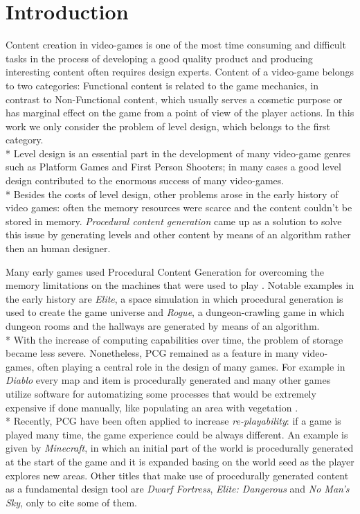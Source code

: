 \chapter{Introduction}

Content creation in video-games is one of the most time consuming and difficult tasks in the process of developing a good quality product and producing interesting content often requires design experts. Content of a video-game belongs to two categories: Functional content is related to the game mechanics, in contrast to Non-Functional content, which usually serves a cosmetic purpose or has marginal effect on the game from a point of view of the player actions. In this work we only consider the problem of level design, which belongs to the first category. \\*
Level design is an essential part in the development of many video-game genres such as Platform Games and First Person Shooters; in many cases a good level design contributed to the enormous success of many video-games. \\*
Besides the costs of level design, other problems arose in the early history of video games: often the memory resources were scarce and the content couldn't be stored in memory. \textit{Procedural content generation} came up as a solution to solve this issue by generating levels and other content by means of an algorithm rather then an human designer.

Many early games used Procedural Content Generation for overcoming the memory limitations on the machines that were used to play \cite{pcgbook}. Notable examples in the early history are \textit{Elite}\cite{game:elite}, a space simulation in which procedural generation is used to create the game universe and \textit{Rogue}\cite{game:rogue}, a dungeon-crawling game in which dungeon rooms and the hallways are generated by means of an algorithm. \\*
With the increase of computing capabilities over time, the problem of storage became less severe. Nonetheless, PCG remained as a feature in many video-games, often playing a central role in the design of many games. For example in \textit{Diablo}\cite{game:diablo} every map and item is procedurally generated and many other games utilize software for automatizing some processes that would be extremely expensive if done manually, like populating an area with vegetation \cite{pcgpaper}.\\*
Recently, PCG have been often applied to increase \textit{re-playability}: if a game is played many time, the game experience could be always different. An example is given by \textit{Minecraft}\cite{game:minecraft}, in which an initial part of the world is procedurally generated at the start of the game and it is expanded basing on the world seed as the player explores new areas. Other titles that make use of procedurally generated content as a fundamental design tool are \textit{Dwarf Fortress}\cite{game:dwarf}, \textit{Elite: Dangerous}\cite{game:elitedangerous} and \textit{No Man's Sky}\cite{game:nomanssky}, only to cite some of them.


